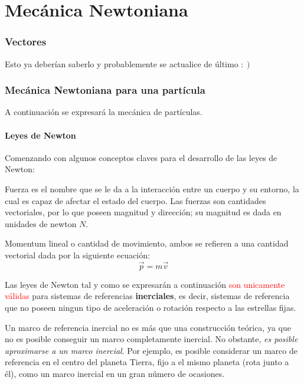 \documentclass[/home/hernan/Documentos/Apuntes_mecanica_teorica/main.tex]{subfiles}
\begin{document}
	\part{Mecánica Newtoniana} 
	\label{prt:Mecánica Newtoniana}

	\section{Vectores}\label{sec:vectores}


	Esto ya deberían saberlo y probablemente se actualice de último $: \left . \!  \right )$

	\newpage
	\section{Mecánica Newtoniana para una partícula}\label{sec: N.particula }

	A continuación se expresará la mecánica de partículas.

	\subsection{Leyes de Newton}
	
	Comenzando con algunos conceptos claves para el desarrollo de las leyes de Newton:

	\begin{definition}
		Fuerza es el nombre que se le da a la interacción entre un cuerpo y su entorno, la cual es capaz de afectar el estado del cuerpo. Las fuerzas son cantidades vectoriales, por lo que poseen magnitud y dirección; su magnitud es dada en unidades de newton $N$.
	\end{definition}

	\begin{definition}
		Momentum lineal o cantidad de movimiento, ambos se refieren a una cantidad vectorial dada por la siguiente ecuación:
		\begin{equation}
			\vec{p} = m \vec{v}
			\label{eq: momentuml}
		\end{equation}
	\end{definition}
	
	Las leyes de Newton tal y como se expresarán a continuación \textcolor{red}{son unicamente válidas}  para sistemas de referencias \textbf{inerciales}, es decir, sistemas de referencia que no poseen ningun tipo de aceleración o rotación respecto a las estrellas fijas. 
	
	Un marco de referencia inercial no es más que una construcción teórica, ya que no es posible conseguir un marco completamente inercial. No obstante, \textit{es posible aproximarse a un marco inercial}. Por ejemplo, es posible considerar un marco de referencia en el centro del planeta Tierra, fijo a el mismo planeta (rota junto a él), como un marco inercial en un gran número de ocasiones.
\end{document}
